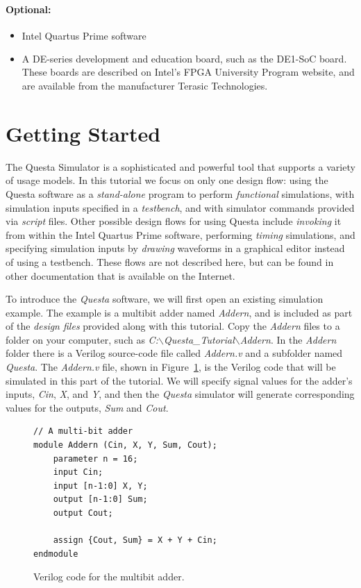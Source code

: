 \documentclass[11pt, twoside, pdftex]{article}
\begin{document}
{\bf Optional:}
\begin{itemize}
\item Intel Quartus\textsuperscript{\textregistered} Prime software
\item A DE-series development and education board, such as the DE1-SoC board. These boards are 
described on Intel's FPGA University Program website, and are available from the manufacturer 
Terasic Technologies.
\end{itemize}

\clearpage
\newpage
\section{Getting Started}

The Questa Simulator is a sophisticated and powerful tool that supports a variety of 
usage models. In this tutorial we focus on only one design flow: using the Questa
software as a {\it stand-alone} program to perform {\it functional} simulations, with 
simulation inputs specified in a {\it testbench}, and with simulator commands provided 
via {\it script} files. Other possible design flows for using Questa include {\it invoking}
it from within the Intel Quartus Prime software, performing {\it timing} simulations, and
specifying simulation inputs by {\it drawing} waveforms in a graphical editor instead of
using a testbench. These flows are not described here, but can be found in other
documentation that is available on the Internet.  

\noindent
To introduce the {\it Questa} software, we will first open an existing simulation example.
The example is a multibit adder named {\it Addern}, and is included as 
part of the {\it design files} provided
along with this tutorial. Copy the {\it Addern} files to a folder on your computer, such
as {\it C:$\backslash$Questa\_Tutorial$\backslash$Addern}. In the {\it Addern} folder
there is a Verilog source-code file called {\it Addern.v} and a subfolder named {\it Questa}.
The {\it Addern.v} file, shown in Figure~\ref{fig:addern}, is the Verilog code that will 
be simulated in this part of the tutorial. We will specify signal 
values for the adder's inputs, {\it Cin}, {\it X}, and {\it Y}, and then the {\it
Questa} simulator will generate corresponding values for the outputs, {\it Sum} and {\it Cout}.

\lstset{language=Verilog,numbers=none,escapechar=|}
\begin{figure}[h]
\begin{center}
\begin{minipage}[t]{12.5 cm}
\begin{lstlisting}[name=addern]
// A multi-bit adder
module Addern (Cin, X, Y, Sum, Cout);
    parameter n = 16;
    input Cin;
    input [n-1:0] X, Y;
    output [n-1:0] Sum;
    output Cout;

    assign {Cout, Sum} = X + Y + Cin;
endmodule
\end{lstlisting}
\end{minipage}
\caption{Verilog code for the multibit adder.}
\label{fig:addern}
\end{center}
\end{figure}
\end{document}
